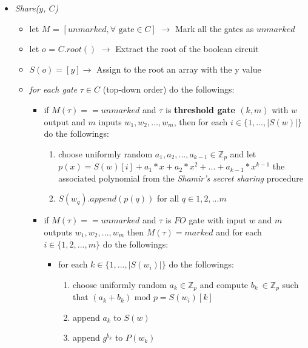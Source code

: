 \documentclass[12pt]{article}
\begin{document}
\begin{enumerate}
		\begin{itemize}
			\item \textit{Share($y$, $C$)}
			\begin{itemize}
				\item let $M$ = $[unmarked, \forall \textrm{ gate} \in C]$ $\rightarrow$ Mark all the gates as $unmarked$
				\item let $o$ = $C.root()$ $\rightarrow$ Extract the root of the boolean circuit
				\item $S(o) = [y] \rightarrow$ Assign to the root an array with the y value   
				\item \textit{for each gate} $\tau \in C$ (top-down order) do the followings:
				\begin{itemize}
				    \item if $M(\tau) == unmarked$ and $\tau$ is \textbf{threshold gate $(k, m)$} with $w$ output and $m$ inputs $w_1, w_2, ..., w_m$, then for each $i \in \{1, ...,|S(w)|\}$ do the followings:
				        \begin{enumerate}
				            \item choose uniformly random $a_1, a_2, ..., a_{k - 1} \in \mathbb{Z}_p$ and let $p(x) = S(w)[i] + a_1 * x + a_2 * x^2 + ... + a_{k-1} * x^{k - 1}$ the associated polynomial from the \textit{Shamir's secret sharing} procedure
				            \item $S(w_q).append(p(q))$ for all $q \in {1, 2, ...m}$  
				        \end{enumerate}
				    \item if $M(\tau) == unmarked$ and $\tau$ is $FO$ gate with input $w$ and $m$ outputs $w_1, w_2, ..., w_m$ then $M(\tau) = marked$ and for each $i \in \{1, 2, ..., m\}$ do the followings:
				    \begin{itemize}
				        \item for each $k \in \{1, ..., |S(w_i)|\}$ do the followings:
				        \begin{enumerate}
				            \item choose uniformly random $a_k \in \mathbb{Z}_p$ and compute $b_k \ \in \mathbb{Z}_p$ such that $(a_k + b_k) \textrm{ mod } p = S(w_i)[k]$
				            \item append $a_k$ to $S(w)$
				            \item append $g^{b_k}$ to $P(w_k)$
				        \end{enumerate}
				    \end{itemize}
				    

\end{itemize}
\end{itemize}
\end{itemize}
\end{enumerate}
\end{document}
